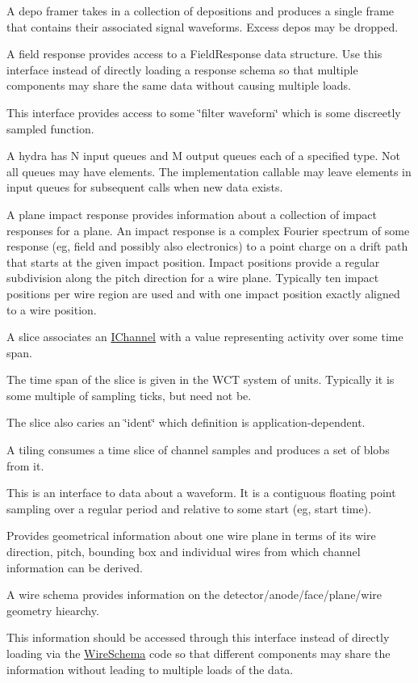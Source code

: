 A depo framer takes in a collection of depositions and produces a single frame that contains their associated signal waveforms. Excess depos may be dropped.

A field response provides access to a Field\+Response data structure. Use this interface instead of directly loading a response schema so that multiple components may share the same data without causing multiple loads.

This interface provides access to some \char`\"{}filter waveform\char`\"{} which is some discreetly sampled function.

A hydra has N input queues and M output queues each of a specified type. Not all queues may have elements. The implementation callable may leave elements in input queues for subsequent calls when new data exists.

A plane impact response provides information about a collection of impact responses for a plane. An impact response is a complex Fourier spectrum of some response (eg, field and possibly also electronics) to a point charge on a drift path that starts at the given impact position. Impact positions provide a regular subdivision along the pitch direction for a wire plane. Typically ten impact positions per wire region are used and with one impact position exactly aligned to a wire position.

A slice associates an \hyperlink{class_wire_cell_1_1_i_channel}{I\+Channel} with a value representing activity over some time span.

The time span of the slice is given in the W\+CT system of units. Typically it is some multiple of sampling ticks, but need not be.

The slice also caries an \char`\"{}ident\char`\"{} which definition is application-\/dependent.

A tiling consumes a time slice of channel samples and produces a set of blobs from it.

This is an interface to data about a waveform. It is a contiguous floating point sampling over a regular period and relative to some start (eg, start time).

Provides geometrical information about one wire plane in terms of its wire direction, pitch, bounding box and individual wires from which channel information can be derived.

A wire schema provides information on the detector/anode/face/plane/wire geometry hiearchy.

This information should be accessed through this interface instead of directly loading via the \hyperlink{namespace_wire_cell_1_1_wire_schema}{Wire\+Schema} code so that different components may share the information without leading to multiple loads of the data.

